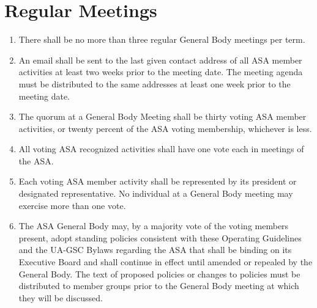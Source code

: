 \documentclass[12pt]{constitution}
\begin{document}
\section{Regular Meetings}
\begin{enumerate}
    \item There shall be no more than three regular General Body meetings per term.
    
    \item An email shall be sent to the last given contact address of all ASA member activities at
        least two weeks prior to the meeting date.
    The meeting agenda must be distributed to the same addresses at least one week prior to the meeting date.

    \item The quorum at a General Body Meeting shall be thirty voting ASA member activities, or
        twenty percent of the ASA voting membership, whichever is less.
    
    \item All voting ASA recognized activities shall have one vote each in meetings of the ASA.

    \item Each voting ASA member activity shall be represented by its president or designated
        representative.
    No individual at a General Body meeting may exercise more than one vote.

    \item The ASA General Body may, by a majority vote of the voting members present, adopt
        standing policies consistent with these Operating Guidelines and the UA-GSC Bylaws
        regarding the ASA that shall be binding on its Executive Board and shall continue in effect
        until amended or repealed by the General Body.
    The text of proposed policies or changes to policies must be distributed to member groups prior
        to the General Body meeting at which they will be discussed.
\end{enumerate}
\end{document}
